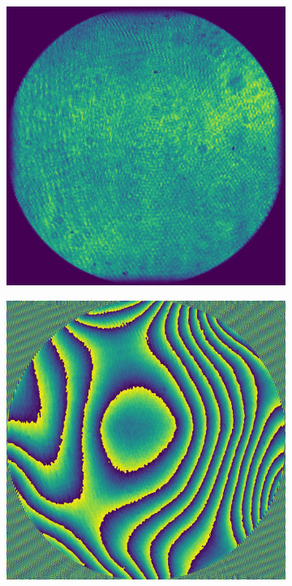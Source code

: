 \begin{figure}
	\begin{subfigure}{0.23\textwidth}
		\centering
		\includegraphics[width=1\linewidth, scale=0.5]{images/puw_complex_phase.png}
		\caption{}
		\label{fig:puw_complex_phase}
	\end{subfigure}
	\begin{subfigure}{0.23\textwidth}
		\centering
		\includegraphics[width=1\linewidth, scale=0.5]{images/puw_phaseorder1.png}

\end{subfigure}
\end{figure}
